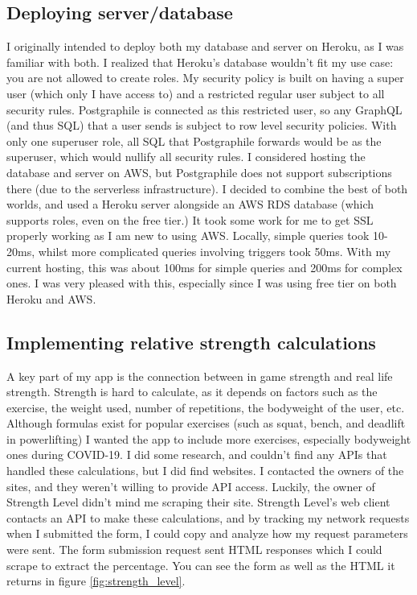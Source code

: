 \documentclass{l4proj}
\begin{document}
\subsection{Deploying server/database}
I originally intended to deploy both my database and server on Heroku, as I was familiar with both. I realized that Heroku's database wouldn't fit my use case: you are not allowed to create roles. My security policy is built on having a super user (which only I have access to) and a restricted regular user subject to all security rules. Postgraphile is connected as this restricted user, so any GraphQL (and thus SQL) that a user sends is subject to row level security policies. With only one superuser role, all SQL that Postgraphile forwards would be as the superuser, which would nullify all security rules. I considered hosting the database and server on AWS, but Postgraphile does not support subscriptions there (due to the serverless infrastructure). I decided to combine the best of both worlds, and used a Heroku server alongside an AWS RDS database (which supports roles, even on the free tier.) It took some work for me to get SSL properly working as I am new to using AWS. Locally, simple queries took 10-20ms, whilst more complicated queries involving triggers took 50ms. With my current hosting, this was about 100ms for simple queries and 200ms for complex ones. I was very pleased with this, especially since I was using free tier on both Heroku and AWS. 

\subsection{Implementing relative strength calculations} \label{strength_calculations}
A key part of my app is the connection between in game strength and real life strength. Strength is hard to calculate, as it depends on factors such as the exercise, the weight used, number of repetitions, the bodyweight of the user, etc. Although formulas exist for popular exercises (such as squat, bench, and deadlift in powerlifting) I wanted the app to include more exercises, especially bodyweight ones during COVID-19. I did some research, and couldn't find any APIs that handled these calculations, but I did find websites. I contacted the owners of the sites, and they weren't willing to provide API access. Luckily, the owner of Strength Level didn't mind me scraping their site. Strength Level's web client contacts an API to make these calculations, and by tracking my network requests when I submitted the form, I could copy and analyze how my request parameters were sent. The form submission request sent HTML responses which I could scrape to extract the percentage. You can see the form as well as the HTML it returns in figure \ref{fig:strength_level}.
\end{document}

